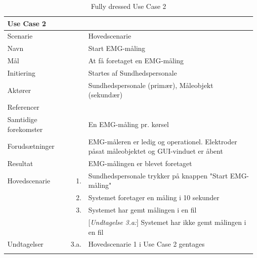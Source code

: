 \begin{longtabu} to  %
	{\large \textbf{Use Case 2}} && \\
	\toprule
	Scenarie 				&&	Hovedscenarie\\
	Navn 					&& 	Start EMG-måling\\
	Mål 					&& 	At få foretaget en EMG-måling\\
	Initiering 				&& 	Startes af Sundhedspersonale\\
	Aktører 				&& 	Sundhedspersonale (primær), Måleobjekt (sekundær)\\
	Referencer 				&& 	\\
	Samtidige forekomster  	&& 	En EMG-måling pr. kørsel \\
	Forudsætninger 			&&	EMG-måleren er ledig og operationel. Elektroder påsat måleobjektet og GUI-vinduet er åbent\\ 
	Resultat 				&& 	EMG-målingen er blevet foretaget \\ \midrule
	Hovedscenarie 			&    1. 	&	Sundhedspersonale trykker på knappen "Start EMG-måling"\\ 				 	
							&    2. 	& 	Systemet foretager en måling i 10 sekunder \\[-1ex]
							& 	 3.		&	 Systemet har gemt målingen i en fil \\[-1ex]
                            &&[\textit{Undtagelse 3.a:}] Systemet har ikke gemt målingen i en fil\\ \midrule
	Undtagelser 			& 3.a. & Hovedscenarie 1 i Use Case 2 gentages\\ \bottomrule
	\caption{Fully dressed Use Case 2}
	\label{UC2}
\end{longtabu}

